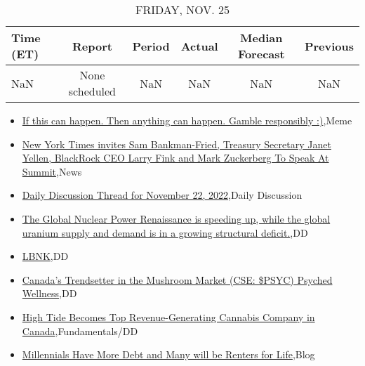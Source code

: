 \documentclass{article}%
\begin{document}
%


\begin{table}[htbp]%
\caption{FRIDAY, NOV. 25}%
\centering%
\begin{adjustbox}{width=1\textwidth}%
\begin{tabular}{lccccc}
\toprule
Time (ET) &         Report & Period & Actual & Median Forecast & Previous \\
\midrule
      NaN & None scheduled &    NaN &    NaN &             NaN &      NaN \\
\bottomrule
\end{tabular}
%
\end{adjustbox}%
\end{table}

%
\begin{itemize}%
\item%
\href{https://reddit.com/r/wallstreetbets/comments/z1s2ol/if\_this\_can\_happen\_then\_anything\_can\_happen/}{If this can happen. Then anything can happen. Gamble responsibly :)},Meme%
\item%
\href{https://reddit.com/r/wallstreetbets/comments/z1rtxy/new\_york\_times\_invites\_sam\_bankmanfried\_treasury/}{New York Times invites Sam Bankman-Fried, Treasury Secretary Janet Yellen, BlackRock CEO Larry Fink and Mark Zuckerberg To Speak At Summit},News%
\item%
\href{https://reddit.com/r/wallstreetbets/comments/z1qpto/daily\_discussion\_thread\_for\_november\_22\_2022/}{Daily Discussion Thread for November 22, 2022},Daily Discussion%
\item%
\href{https://reddit.com/r/Baystreetbets/comments/z1e9bj/the\_global\_nuclear\_power\_renaissance\_is\_speeding/}{The Global Nuclear Power Renaissance is speeding up, while the global uranium supply and demand is in a growing structural deficit.},DD%
\item%
\href{https://reddit.com/r/Baystreetbets/comments/z1c1ir/lbnk/}{LBNK},DD%
\item%
\href{https://reddit.com/r/Baystreetbets/comments/z0zmtx/canadas\_trendsetter\_in\_the\_mushroom\_market\_cse/}{Canada's Trendsetter in the Mushroom Market (CSE: \$PSYC) Psyched Wellness},DD%
\item%
\href{https://reddit.com/r/StockMarket/comments/z1slp5/high\_tide\_becomes\_top\_revenuegenerating\_cannabis/}{High Tide Becomes Top Revenue-Generating Cannabis Company in Canada},Fundamentals/DD%
\item%
\href{https://reddit.com/r/Economics/comments/z1ohy5/millennials\_have\_more\_debt\_and\_many\_will\_be/}{Millennials Have More Debt and Many will be Renters for Life},Blog%
\end{itemize}%
\end{document}
